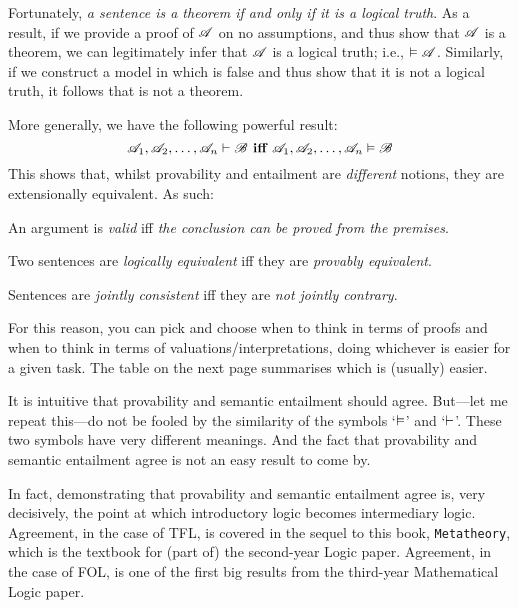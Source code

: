 Fortunately, \emph{a sentence is a theorem if and only if it is a logical truth}. As a result, if we provide a proof of $\mathscr{A}$ on no assumptions, and thus show that $\mathscr{A}$ is a theorem, we can legitimately infer that $\mathscr{A}$ is a logical truth; i.e., $\vDash\mathscr{A}$. Similarly, if we construct a model in which  is false and thus show that it is not a logical truth, it follows that  is not a theorem.

More generally, we have the following powerful result:
$$\mathscr{A}_1, \mathscr{A}_2, \ldots, \mathscr{A}_n \vdash\mathscr{B} \textbf{ iff }\mathscr{A}_1, \mathscr{A}_2, \ldots, \mathscr{A}_n \vDash\mathscr{B}$$
This shows that, whilst provability and entailment are \emph{different} notions, they are extensionally equivalent. As such:
	\begin{ebullet}
		\item An argument is \emph{valid} iff \emph{the conclusion can be proved from the premises}.
		\item Two sentences are \emph{logically equivalent} iff they are \emph{provably equivalent}.
		\item Sentences are \emph{jointly consistent} iff they are \emph{not jointly contrary}.
	\end{ebullet}
For this reason, you can pick and choose when to think in terms of proofs and when to think in terms of valuations/interpretations, doing whichever is easier for a given task. The table on the next page summarises which is (usually) easier.

It is intuitive that provability and semantic entailment should agree. But---let me repeat this---do not be fooled by the similarity of the symbols `$\vDash$' and `$\vdash$'. These two symbols have very different meanings. And the fact that provability and semantic entailment agree is not an easy result to come by. 

In fact, demonstrating that provability and semantic entailment agree is, very decisively, the point at which introductory logic becomes intermediary logic. Agreement, in the case of TFL, is covered in the sequel to this book, \texttt{Metatheory}, which is the textbook for (part of) the second-year Logic paper. Agreement, in the case of FOL, is one of the first big results from the third-year Mathematical Logic paper.

